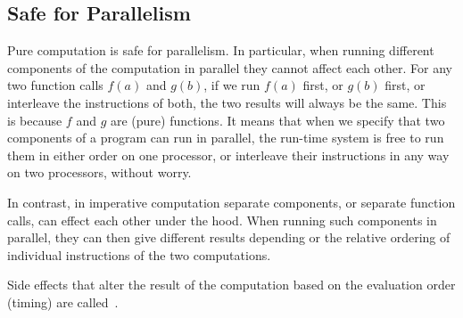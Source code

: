 \subsection{Safe for Parallelism}
\label{sec:language::functional-algorithms::safe-for-parallelism}

\begin{cluster}
\label{grp:grm:language::functional-algorithms::computation}

\begin{gram}
\label{grm:language::functional-algorithms::computation}
Pure computation is safe for parallelism.
In particular, when running different components of the computation in parallel they
cannot affect each other.  For any two function calls $f(a)$ and
$g(b)$, if we run $f(a)$ first, or $g(b)$ first, or interleave the
instructions of both, the two results will always be the same.  This
is because $f$ and $g$ are (pure) functions.  It means that when we
specify that two components of a program can run in parallel, the
run-time system is free to run them in either order on one processor, or
interleave their instructions in any way on two processors, without
worry.

In contrast, in imperative computation separate components, or
separate function calls, can effect each other under the hood.   
When running such components in parallel, they can then give different
results depending or the relative ordering of individual instructions
of
the two computations.     

\end{gram}
\end{cluster}

\begin{cluster}
\label{grp:def:language::functional-algorithms::race-conditions}

\begin{definition}
\label{def:language::functional-algorithms::race-conditions}
Side effects that alter the result of the computation based on the
evaluation order (timing) are called~.

\end{definition}
\end{cluster}

